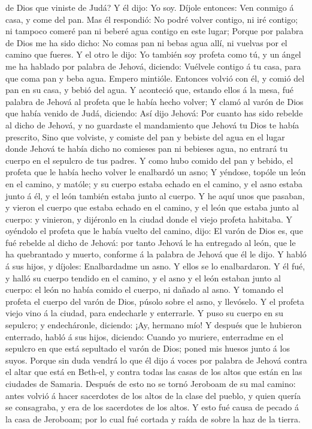 de Dios que viniste de Judá? Y él dijo: Yo soy.  Díjole
entonces: Ven conmigo á casa, y come del pan.  Mas él
respondió: No podré volver contigo, ni iré contigo; ni tampoco comeré
pan ni beberé agua contigo en este lugar;  Porque por
palabra de Dios me ha sido dicho: No comas pan ni bebas agua allí, ni
vuelvas por el camino que fueres.  Y el otro le dijo: Yo
también soy profeta como tú, y un ángel me ha hablado por palabra de
Jehová, diciendo: Vuélvele contigo á tu casa, para que coma pan y beba
agua. Empero mintióle.  Entonces volvió con él, y comió
del pan en su casa, y bebió del agua.  Y aconteció que,
estando ellos á la mesa, fué palabra de Jehová al profeta que le había
hecho volver;  Y clamó al varón de Dios que había venido
de Judá, diciendo: Así dijo Jehová: Por cuanto has sido rebelde al dicho
de Jehová, y no guardaste el mandamiento que Jehová tu Dios te había
prescrito,  Sino que volviste, y comiste del pan y
bebiste del agua en el lugar donde Jehová te había dicho no comieses pan
ni bebieses agua, no entrará tu cuerpo en el sepulcro de tus padres.
 Y como hubo comido del pan y bebido, el profeta que le
había hecho volver le enalbardó un asno;  Y yéndose,
topóle un león en el camino, y matóle; y su cuerpo estaba echado en el
camino, y el asno estaba junto á él, y el león también estaba junto al
cuerpo.  Y he aquí unos que pasaban, y vieron el cuerpo
que estaba echado en el camino, y el león que estaba junto al cuerpo: y
vinieron, y dijéronlo en la ciudad donde el viejo profeta habitaba.
 Y oyéndolo el profeta que le había vuelto del camino,
dijo: El varón de Dios es, que fué rebelde al dicho de Jehová: por tanto
Jehová le ha entregado al león, que le ha quebrantado y muerto, conforme
á la palabra de Jehová que él le dijo.  Y habló á sus
hijos, y díjoles: Enalbardadme un asno. Y ellos se lo enalbardaron.
 Y él fué, y halló su cuerpo tendido en el camino, y el
asno y el león estaban junto al cuerpo: el león no había comido el
cuerpo, ni dañado al asno.  Y tomando el profeta el
cuerpo del varón de Dios, púsolo sobre el asno, y llevóselo. Y el
profeta viejo vino á la ciudad, para endecharle y enterrarle.
 Y puso su cuerpo en su sepulcro; y endecháronle,
diciendo: ¡Ay, hermano mío!  Y después que le hubieron
enterrado, habló á sus hijos, diciendo: Cuando yo muriere, enterradme en
el sepulcro en que está sepultado el varón de Dios; poned mis huesos
junto á los suyos.  Porque sin duda vendrá lo que él dijo
á voces por palabra de Jehová contra el altar que está en Beth-el, y
contra todas las casas de los altos que están en las ciudades de
Samaria.  Después de esto no se tornó Jeroboam de su mal
camino: antes volvió á hacer sacerdotes de los altos de la clase del
pueblo, y quien quería se consagraba, y era de los sacerdotes de los
altos.  Y esto fué causa de pecado á la casa de Jeroboam;
por lo cual fué cortada y raída de sobre la haz de la tierra.

